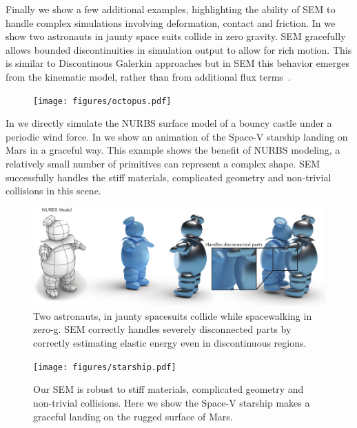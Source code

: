 Finally we show a few additional examples, highlighting the ability of SEM to handle complex simulations involving deformation, contact and friction.
In  we show two astronauts in jaunty space suits collide in zero gravity. 
SEM gracefully allows bounded discontinuities in simulation output to allow for rich motion. 
This is similar to Discontinous Galerkin approaches but in SEM this behavior emerges from the kinematic model, rather than from additional flux terms~\cite{kaufmann2009flexible}.

\begin{figure}[h]
  \texttt{[image: figures/octopus.pdf]}
  \caption{}
  \label{fig:octopus}
\end{figure}

In  we directly simulate the NURBS surface model of a bouncy castle under a periodic wind force. 
In  we show an animation of the Space-V starship landing on Mars in a graceful way. 
This example shows the benefit of NURBS modeling, a relatively small number of primitives can represent a complex shape.
SEM successfully handles the stiff materials, complicated geometry and non-trivial collisions in this scene.

\begin{figure}[htp]
  \includegraphics[width=\textwidth]{figures/astronauts.pdf}
  \caption{Two astronauts, in jaunty spacesuits collide while spacewalking in zero-g. SEM correctly handles severely disconnected parts by correctly estimating elastic energy even in discontinuous regions.}
  \label{fig:staypuft}
\end{figure}

\begin{figure}[htp]
  \texttt{[image: figures/starship.pdf]}
  \caption{Our SEM is robust to stiff materials, complicated geometry and non-trivial collisions. Here we show the Space-V starship makes a graceful landing on the rugged surface of Mars. }
  \label{fig:starship}
\end{figure}
